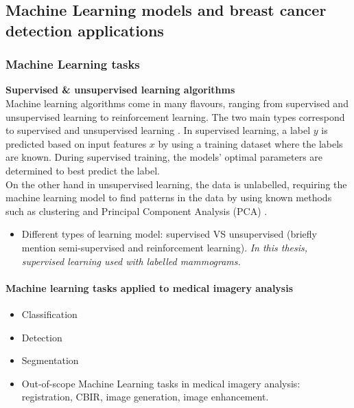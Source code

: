 \documentclass[letterpaper,12pt]{article}
\begin{document}


\subsection{Machine Learning models and breast cancer detection applications}

\subsubsection{Machine Learning tasks}

\textbf{Supervised \& unsupervised learning algorithms}\\

Machine learning algorithms come in many flavours, ranging from supervised and unsupervised learning to reinforcement learning. The two main types correspond to supervised and unsupervised learning \cite{Geron2019}. In supervised learning, a label $y$ is predicted based on input features $x$ by using a training dataset where the labels are known. During supervised training, the models' optimal parameters are determined to best predict the label.\\

On the other hand in unsupervised learning, the data is unlabelled, requiring the machine learning model to find patterns in the data by using known methods such as clustering and Principal Component Analysis (PCA) \cite{Litjens2017}.

\begin{itemize}
    \item Different types of learning model: supervised VS unsupervised (briefly mention semi-supervised and reinforcement learning). \textit{In this thesis, supervised learning used with labelled mammograms.}
\end{itemize}

\paragraph{Machine learning tasks applied to medical imagery analysis}

\begin{itemize}
    \item Classification
    \item Detection
    \item Segmentation
    \item Out-of-scope Machine Learning tasks in medical imagery analysis: registration, CBIR, image generation, image enhancement.
\end{itemize}
\end{document}
